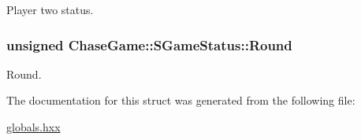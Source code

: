 Player two status. 

\hypertarget{struct_chase_game_1_1_s_game_status_afd8742d8a27af58077d4a9fe9f9b1c4f}{
\subsubsection[{Round}]{\setlength{\rightskip}{0pt plus 5cm}unsigned Chase\-Game\-::\-S\-Game\-Status\-::\-Round}}\label{struct_chase_game_1_1_s_game_status_afd8742d8a27af58077d4a9fe9f9b1c4f}


Round. 



The documentation for this struct was generated from the following file\-:\begin{DoxyCompactItemize}
\item 
\hyperlink{globals_8hxx}{globals.\-hxx}\end{DoxyCompactItemize}
